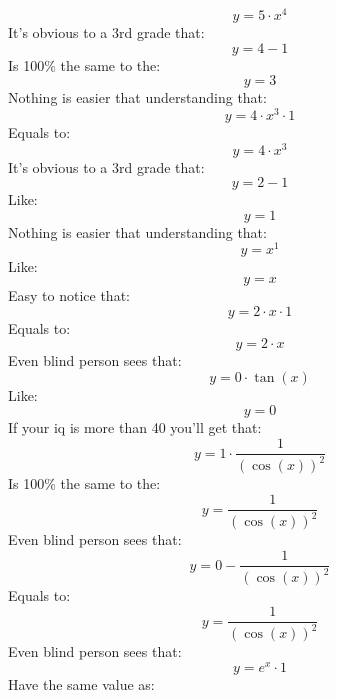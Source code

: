 \documentclass{article}
\begin{document}
\begin{center}
\begin{dmath}
 y = 5\cdot x^{4}
\end{dmath}
It's obvious to a 3rd grade that:
\begin{dmath}
 y = 4-1
\end{dmath}
Is 100\% the same to the:
\begin{dmath}
 y = 3
\end{dmath}
Nothing is easier that understanding that:
\begin{dmath}
 y = 4\cdot x^{3}\cdot 1
\end{dmath}
Equals to:
\begin{dmath}
 y = 4\cdot x^{3}
\end{dmath}
It's obvious to a 3rd grade that:
\begin{dmath}
 y = 2-1
\end{dmath}
Like:
\begin{dmath}
 y = 1
\end{dmath}
Nothing is easier that understanding that:
\begin{dmath}
 y = x^{1}
\end{dmath}
Like:
\begin{dmath}
 y = x
\end{dmath}
Easy to notice that:
\begin{dmath}
 y = 2\cdot x\cdot 1
\end{dmath}
Equals to:
\begin{dmath}
 y = 2\cdot x
\end{dmath}
Even blind person sees that:
\begin{dmath}
 y = 0\cdot \tan (x)
\end{dmath}
Like:
\begin{dmath}
 y = 0
\end{dmath}
If your iq is more than 40 you'll get that:
\begin{dmath}
 y = 1\cdot \dfrac{1}{(\cos (x))^{2}}
\end{dmath}
Is 100\% the same to the:
\begin{dmath}
 y = \dfrac{1}{(\cos (x))^{2}}
\end{dmath}
Even blind person sees that:
\begin{dmath}
 y = 0-\dfrac{1}{(\cos (x))^{2}}
\end{dmath}
Equals to:
\begin{dmath}
 y = \dfrac{1}{(\cos (x))^{2}}
\end{dmath}
Even blind person sees that:
\begin{dmath}
 y = e^{x}\cdot 1
\end{dmath}
Have the same value as:

\end{center}
\end{document}
